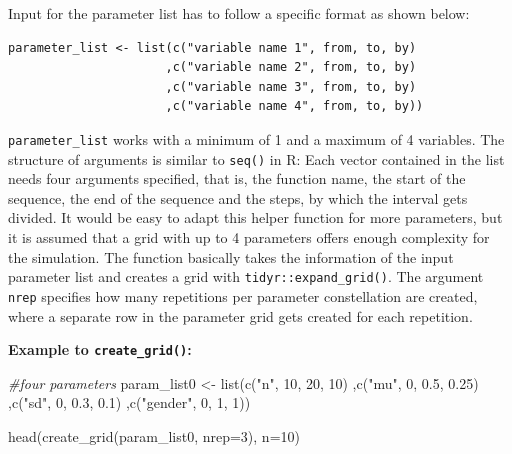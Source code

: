 \documentclass[11pt,a4paper]{article}
\newenvironment{Shaded}{\begin{snugshade}}{\end{snugshade}}
\newcommand{\AttributeTok}[1]{\textcolor[rgb]{0.77,0.63,0.00}{#1}}
\newcommand{\CommentTok}[1]{\textcolor[rgb]{0.56,0.35,0.01}{\textit{#1}}}
\newcommand{\DecValTok}[1]{\textcolor[rgb]{0.00,0.00,0.81}{#1}}
\newcommand{\FloatTok}[1]{\textcolor[rgb]{0.00,0.00,0.81}{#1}}
\newcommand{\FunctionTok}[1]{\textcolor[rgb]{0.00,0.00,0.00}{#1}}
\newcommand{\NormalTok}[1]{#1}
\newcommand{\OtherTok}[1]{\textcolor[rgb]{0.56,0.35,0.01}{#1}}
\newcommand{\StringTok}[1]{\textcolor[rgb]{0.31,0.60,0.02}{#1}}
\begin{document}
Input for the parameter list has to follow a specific format as shown
below:

\begin{verbatim}
parameter_list <- list(c("variable name 1", from, to, by) 
                      ,c("variable name 2", from, to, by)
                      ,c("variable name 3", from, to, by)
                      ,c("variable name 4", from, to, by))
\end{verbatim}

\texttt{parameter\_list} works with a minimum of 1 and a maximum of 4
variables. The structure of arguments is similar to \texttt{seq()} in R:
Each vector contained in the list needs four arguments specified, that
is, the function name, the start of the sequence, the end of the
sequence and the steps, by which the interval gets divided. It would be
easy to adapt this helper function for more parameters, but it is
assumed that a grid with up to 4 parameters offers enough complexity for
the simulation. The function basically takes the information of the
input parameter list and creates a grid with
\texttt{tidyr::expand\_grid()}. The argument \texttt{nrep} specifies how
many repetitions per parameter constellation are created, where a
separate row in the parameter grid gets created for each repetition.

\textbf{Example to \texttt{create\_grid()}:}

\begin{Shaded}
\begin{Highlighting}[]
\CommentTok{\#four parameters }
\NormalTok{param\_list0 }\OtherTok{\textless{}{-}} \FunctionTok{list}\NormalTok{(}\FunctionTok{c}\NormalTok{(}\StringTok{"n"}\NormalTok{, }\DecValTok{10}\NormalTok{, }\DecValTok{20}\NormalTok{, }\DecValTok{10}\NormalTok{)}
\NormalTok{                    ,}\FunctionTok{c}\NormalTok{(}\StringTok{"mu"}\NormalTok{, }\DecValTok{0}\NormalTok{, }\FloatTok{0.5}\NormalTok{, }\FloatTok{0.25}\NormalTok{)}
\NormalTok{                    ,}\FunctionTok{c}\NormalTok{(}\StringTok{"sd"}\NormalTok{, }\DecValTok{0}\NormalTok{, }\FloatTok{0.3}\NormalTok{, }\FloatTok{0.1}\NormalTok{)}
\NormalTok{                    ,}\FunctionTok{c}\NormalTok{(}\StringTok{"gender"}\NormalTok{, }\DecValTok{0}\NormalTok{, }\DecValTok{1}\NormalTok{, }\DecValTok{1}\NormalTok{))}

\FunctionTok{head}\NormalTok{(}\FunctionTok{create\_grid}\NormalTok{(param\_list0, }\AttributeTok{nrep=}\DecValTok{3}\NormalTok{), }\AttributeTok{n=}\DecValTok{10}\NormalTok{)}
\end{Highlighting}
\end{Shaded}
\end{document}
